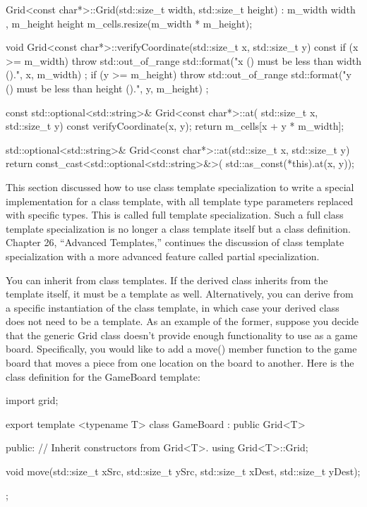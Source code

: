 \begin{cpp}
Grid<const char*>::Grid(std::size_t width, std::size_t height)
: m_width { width }, m_height { height }
{
    m_cells.resize(m_width * m_height);
}

void Grid<const char*>::verifyCoordinate(std::size_t x, std::size_t y) const
{
    if (x >= m_width) {
        throw std::out_of_range {
            std::format("x ({}) must be less than width ({}).", x, m_width) };
    }
    if (y >= m_height) {
        throw std::out_of_range {
            std::format("y ({}) must be less than height ({}).", y, m_height) };
    }
}

const std::optional<std::string>& Grid<const char*>::at(
std::size_t x, std::size_t y) const
{
    verifyCoordinate(x, y);
    return m_cells[x + y * m_width];
}

std::optional<std::string>& Grid<const char*>::at(std::size_t x, std::size_t y)
{
    return const_cast<std::optional<std::string>&>(
    std::as_const(*this).at(x, y));
}
\end{cpp}

This section discussed how to use class template specialization to write a special implementation for a class template, with all template type parameters replaced with specific types. This is called full template specialization. Such a full class template specialization is no longer a class template itself but a class definition. Chapter 26, “Advanced Templates,” continues the discussion of class template specialization with a more advanced feature called partial specialization.


You can inherit from class templates. If the derived class inherits from the template itself, it must be a template as well. Alternatively, you can derive from a specific instantiation of the class template, in which case your derived class does not need to be a template. As an example of the former, suppose you decide that the generic Grid class doesn’t provide enough functionality to use as a game board. Specifically, you would like to add a move() member function to the game board that moves a piece from one location on the board to another. Here is the class definition for the GameBoard template:

\begin{cpp}
import grid;

export template <typename T>
class GameBoard : public Grid<T>
{
    public:
        // Inherit constructors from Grid<T>.
        using Grid<T>::Grid;

        void move(std::size_t xSrc, std::size_t ySrc,
            std::size_t xDest, std::size_t yDest);
};
\end{cpp}

